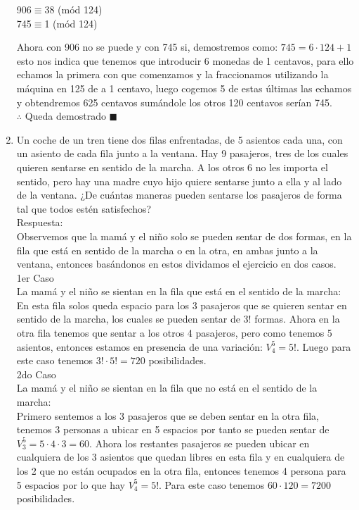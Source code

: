 \documentclass{book}
\begin{document}
\begin{enumerate}
        \begin{center}
            906$\equiv$38 (mód 124)\\
            745$\equiv$1 (mód 124)
        \end{center}
        Ahora con 906 no se puede y con 745 si, demostremos como: $745=6\cdot 124+1$ esto nos indica que tenemos que introducir 6 monedas de 1 centavos, para ello echamos la primera con que comenzamos y la fraccionamos utilizando la máquina en 125 de a 1 centavo, luego cogemos 5 de estas últimas las echamos y obtendremos 625 centavos sumándole los otros 120 centavos serían 745. \\$\therefore$ Queda demostrado $\blacksquare$\\
        \item Un coche de un tren tiene dos filas enfrentadas, de 5 asientos cada una, con un asiento de cada fila junto a la ventana. Hay 9 pasajeros, tres de los cuales quieren sentarse en sentido de la marcha. A los otros 6 no les importa el sentido, pero hay una madre cuyo hijo quiere sentarse junto a ella y al lado de la ventana. ¿De cuántas maneras pueden sentarse los pasajeros de forma tal que todos estén satisfechos?\\
        Respuesta:\\
        Observemos que la mamá y el niño solo se pueden sentar de dos formas, en la fila que está en sentido de la marcha o en la otra, en ambas junto a la ventana, entonces basándonos en estos dividamos el ejercicio en dos casos.\\
        1er Caso\\
        La mamá y el niño se sientan en la fila que está en el sentido de la marcha:\\
        En esta fila solos queda espacio para los 3 pasajeros que se quieren sentar en sentido de la marcha, los cuales se pueden sentar de 3! formas. Ahora en la otra fila tenemos que sentar a los otros 4 pasajeros, pero como tenemos 5 asientos, entonces estamos en presencia de una variación: $V_{4}^{5}=5!$. Luego para este caso tenemos $3!\cdot 5!=720$ posibilidades.\\
        2do Caso\\
        La mamá y el niño se sientan en la fila que no está en el sentido de la marcha:\\
        Primero sentemos a los 3 pasajeros que se deben sentar en la otra fila, tenemos 3 personas a ubicar en 5 espacios por tanto se pueden sentar de $V_{3}^{5}=5\cdot 4\cdot 3=60$. Ahora los restantes pasajeros se pueden ubicar en cualquiera de los 3 asientos que quedan libres en esta fila y en cualquiera de los 2 que no están ocupados en la otra fila, entonces tenemos 4 persona para 5 espacios por lo que hay $V_{4}^{5}=5!$. Para este caso tenemos $60\cdot 120=7200$ posibilidades.\\

\end{enumerate}
\end{document}
